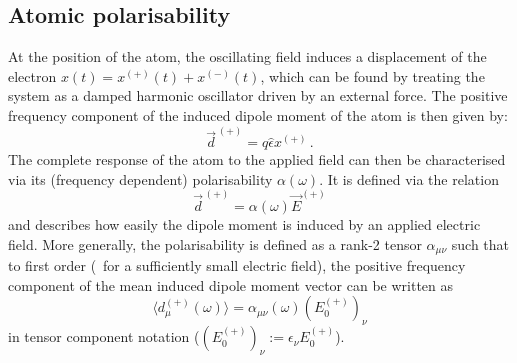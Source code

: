 \documentclass[../Thesis-IJspeert.tex]{subfiles}
\begin{document}
\subsection{Atomic polarisability}
At the position of the atom, the oscillating field induces a displacement of the electron $x(t)=x^{(+)}(t)+x^{(-)}(t)$, which can be found by treating the system as a damped harmonic oscillator driven by an external force. The positive frequency component of the induced dipole moment of the atom is then given by:
\begin{equation}
\label{dipolemoment}
\vec{d}^{\,(+)}= q \hat{\epsilon} x^{(+)} \,.
\end{equation}
The complete response of the atom to the applied field can then be characterised via its (frequency dependent) polarisability $\alpha (\omega)$. It is defined via the relation
\begin{equation}
	\vec{d}^{\,(+)}=\alpha(\omega)\vec{E}^{(+)}
\end{equation}
and describes how easily the dipole moment is induced by an applied electric field. More generally, the polarisability is defined as a rank-2 tensor $\alpha_{\mu \nu}$ such that to first order (\ie\ for a sufficiently small electric field), the positive frequency component of the mean induced dipole moment vector can be written as
\begin{equation}
\label{definingrelationpolarisability}
\langle d_\mu^{(+)}(\omega) \rangle = \alpha_{\mu \nu}(\omega) ( E_0^{(+)} )_\nu	
\end{equation}
in tensor component notation ($( E_0^{(+)} )_\nu:={\epsilon}_\nu E_0^{(+)}$).
\end{document}
